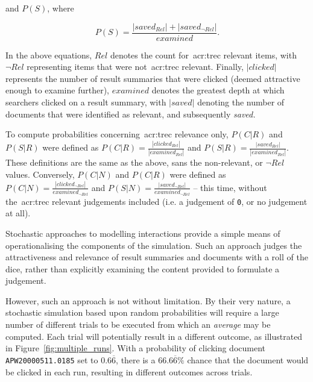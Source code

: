 and $P(S)$, where

\begin{equation}
    P(S) = \frac{|saved_{Rel}| + | saved_{\neg Rel} |}{examined}.
\end{equation}

In the above equations, $Rel$ denotes the count for~\gls{acr:trec} relevant items, with $\neg Rel$ representing items that were not~\gls{acr:trec} relevant. Finally, $|clicked|$ represents the number of result summaries that were clicked (deemed attractive enough to examine further), $examined$ denotes the greatest depth at which searchers clicked on a result summary, with $|saved|$ denoting the number of documents that were identified as relevant, and subsequently \emph{saved.}

To compute probabilities concerning~\gls{acr:trec} relevance only, $P(C|R)$ and $P(S|R)$ were defined as $P(C|R) = \frac{|clicked_{Rel}|}{|examined_{Rel}|}$ and $P(S|R) = \frac{|saved_{Rel}|}{|examined_{Rel}|}$. These definitions are the same as the above, sans the non-relevant, or $\neg Rel$ values. Conversely, $P(C|N)$ and $P(C|R)$ were defined as $P(C|N) = \frac{|clicked_{\neg Rel}|}{examined_{\neg Rel}}$ and $P(S|N) = \frac{|saved_{\neg Rel}|}{examined_{\neg Rel}}$ -- this time, without the~\gls{acr:trec} relevant judgements included (i.e. a judgement of \texttt{0}, or no judgement at all).

Stochastic approaches to modelling interactions provide a simple means of operationalising the components of the simulation. Such an approach judges the attractiveness and relevance of result summaries and documents with a roll of the dice, rather than explicitly examining the content provided to formulate a judgement.

However, such an approach is not without limitation. By their very nature, a stochastic simulation based upon random probabilities will require a large number of different trials to be executed from which an \emph{average} may be computed. Each trial will potentially result in a different outcome, as illustrated in Figure~\ref{fig:multiple_runs}. With a probability of clicking document \texttt{APW20000511.0185} set to $0.6\overline{6}$, there is a $66.6\overline{6}\%$ chance that the document would be clicked in each run, resulting in different outcomes across trials.

